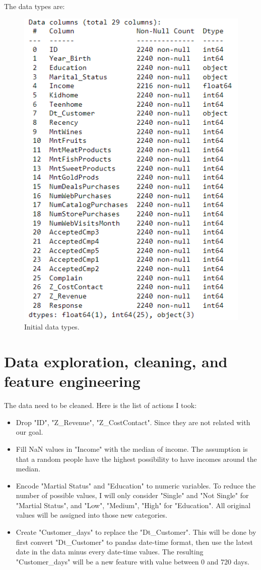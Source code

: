 \documentclass[11pt]{article}
\begin{document}
\newpage

The data types are:

\begin{figure}[h!]
\centerline{\includegraphics[scale=0.5]{clu_1.png}}
\caption{Initial data types.}
\end{figure}

\section{Data exploration, cleaning, and feature engineering}\label{section-introduction-3}
The data need to be cleaned. Here is the list of actions I took:

\begin{itemize}
\item Drop "ID", "Z\_Revenue", "Z\_CostContact".
Since they are not related with our goal.
\item Fill NaN values in "Income" with the median of income. 
The assumption is that a random people have the highest possibility to have incomes around the median.
\item Encode "Martial Status" and "Education" to numeric variables. 
To reduce the number of possible values, I will only consider "Single" and "Not Single" for "Martial Status", and "Low", "Medium", "High" for "Education". All original values will be assigned into those new categories.
\item Create "Customer\_days" to replace the "Dt\_Customer".
This will be done by first convert "Dt\_Customer" to pandas date-time format, then use the latest date in the data minus every date-time values. The resulting "Customer\_days" will be a new feature with value between 0 and 720 days.
\end{itemize}
\end{document}
